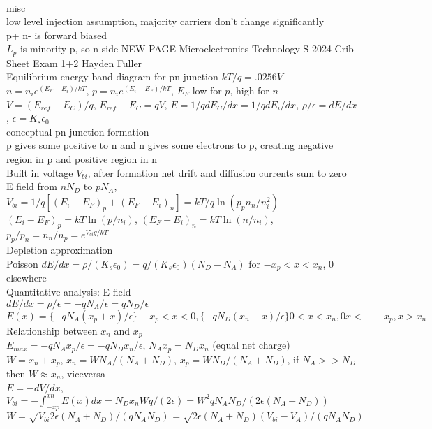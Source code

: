 \documentclass{article}
\begin{document}
\\misc
\\low level injection assumption, majority carriers don't change significantly
\\p+ n- is forward biased
\\$L_p$ is minority p, so n side
NEW PAGE
Microelectronics Technology S 2024 Crib Sheet Exam 1+2 Hayden Fuller
\\Equilibrium energy band diagram for pn junction $kT/q=.0256V$
\\$n=n_i e^{(E_F-E_i)/kT}$, $p=n_i e^{(E_i-E_F)/kT}$, $E_F$ low for $p$, high for $n$
\\$V=(E_{ref}-E_C)/q$, $E_{ref}-E_C=qV$, $E=1/q dE_C/dx=1/q dE_i/dx$, $\rho/\epsilon=dE/dx$, $\epsilon=K_s\epsilon_0$
\\conceptual pn junction formation
\\p gives some positive to n and n gives some electrons to p, creating negative region in p and positive region in n
\\Built in voltage $V_{bi}$, after formation net drift and diffusion currents sum to zero
\\E field from $n N_D$ to $p N_A$, $V_{bi}=1/q [(E_i-E_F)_p + (E_F-E_i)_n]=kT/q\ln(p_pn_n/n_i^2)$
\\$(E_i-E_F)_p=kT\ln(p/n_i)$, $(E_F-E_i)_n=kT\ln(n/n_i)$, $p_p/p_n=n_n/n_p=e^{V_{bi} q/kT}$
\\Depletion approximation 
\\Poisson $dE/dx=\rho/(K_s\epsilon_0)=q/(K_s\epsilon_0) (N_D-N_A)$ for $-x_p<x<x_n$, $0$ elsewhere
\\Quantitative analysis: E field
\\$dE/dx=\rho/\epsilon=-qN_A/\epsilon=qN_D/\epsilon$
\\$E(x)=\{-qN_A(x_p+x)/\epsilon\} -x_p<x<0, \{-qN_D(x_n-x)/\epsilon\} 0<x<x_n, {0} x<--x_p, x>x_n$
\\Relationship between $x_n$ and $x_p$
\\$E_{max}=-qN_Ax_p/\epsilon=-qN_Dx_n/\epsilon$, $N_Ax_p=N_Dx_n$ (equal net charge)
\\$W=x_n+x_p$, $x_n=W N_A/(N_A+N_D)$, $x_p=W N_D/(N_A+N_D)$, if $N_A>>N_D$ then $W\approx x_n$, viceversa
\\$E=-dV/dx$, $V_{bi}=-\int_{-xp}^{xn} E(x) dx=N_Dx_nWq/(2\epsilon)=W^2qN_AN_D/(2\epsilon (N_A+N_D))$
\\$W=\sqrt{V_{bi}2\epsilon(N_A+N_D)/(qN_AN_D)}=\sqrt{2\epsilon(N_A+N_D)(V_{bi}-V_A)/(qN_AN_D)}$
\end{document}
